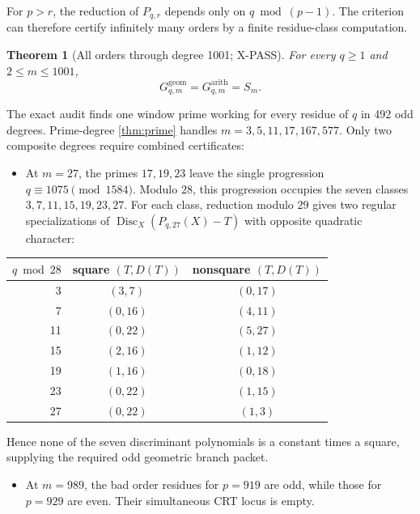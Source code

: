 \documentclass[11pt]{article}
\theoremstyle{keio}
\newtheorem{theorem}{Theorem}[section]
\theoremstyle{keioinput}
\newcommand{\XPASS}{\textcolor{xpassblue}{\textsf{X-PASS}}}
\begin{document}
For $p>r$, the reduction of $P_{q,r}$ depends only on $q\bmod(p-1)$. The
criterion can therefore certify infinitely many orders by a finite
residue-class computation.

\begin{theorem}[All orders through degree 1001; \XPASS]\label{thm:1001}
For every $q\ge1$ and $2\le m\le1001$,
\begin{equation}
\boxed{G^{\mathrm{geom}}_{q,m}=G^{\mathrm{arith}}_{q,m}=S_m.}
\label{eq:1001}
\end{equation}
\end{theorem}

The exact audit finds one window prime working for every residue of $q$ in
492 odd degrees. Prime-degree \cref{thm:prime} handles
$m=3,5,11,17,167,577$. Only two composite degrees require combined
certificates:
\begin{itemize}
\item At $m=27$, the primes $17,19,23$ leave the single progression
$q\equiv1075\pmod{1584}$. Modulo $28$, this progression occupies the seven
classes $3,7,11,15,19,23,27$. For each class, reduction modulo $29$ gives
two regular specializations of
$\operatorname{Disc}_X(P_{q,27}(X)-T)$ with opposite quadratic character:
\end{itemize}

\begin{center}
\small
\begin{tabular}{@{}rcc@{}}
\toprule
$q\bmod 28$ & square $(T,D(T))$ & nonsquare $(T,D(T))$\\
\midrule
3  & $(3,7)$  & $(0,17)$\\
7  & $(0,16)$ & $(4,11)$\\
11 & $(0,22)$ & $(5,27)$\\
15 & $(2,16)$ & $(1,12)$\\
19 & $(1,16)$ & $(0,18)$\\
23 & $(0,22)$ & $(1,15)$\\
27 & $(0,22)$ & $(1,3)$\\
\bottomrule
\end{tabular}
\end{center}

Hence none of the seven discriminant polynomials is a constant times a
square, supplying the required odd geometric branch packet.

\begin{itemize}
\item At $m=989$, the bad order residues for $p=919$ are odd, while those
for $p=929$ are even. Their simultaneous CRT locus is empty.
\end{itemize}
\end{document}
